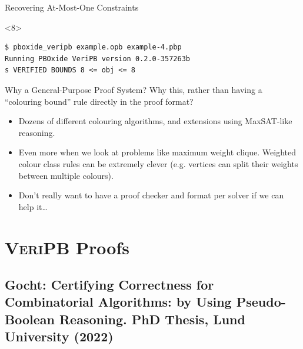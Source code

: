\documentclass[aspectratio=169,compress,10pt]{beamer}
\makeatletter
\newcommand{\proofsystemformat}[1]{\textsc{#1}\@}
\newcommand{\veripb}{\proofsystemformat{VeriPB}\xspace}
\makeatother
\begin{document}
\begin{frame}[fragile]{Recovering At-Most-One Constraints}
\begin{onlyenv}
%
\end{onlyenv}\begin{onlyenv}<8>
\begin{Verbatim}
$ pboxide_veripb example.opb example-4.pbp
Running PBOxide VeriPB version 0.2.0-357263b
s VERIFIED BOUNDS 8 <= obj <= 8
\end{Verbatim}
\end{onlyenv}
\end{frame}

\begin{frame}{Why a General-Purpose Proof System?}
    Why this, rather than having a ``colouring bound'' rule directly in the proof format?
    \begin{itemize}
        \item Dozens of different colouring algorithms, and extensions using MaxSAT-like reasoning.
        \item Even more when we look at problems like maximum weight clique.
            Weighted colour class rules can be extremely clever (e.g. vertices can split their weights
            between multiple colours).
        \item Don't really want to have a proof checker and format per solver if we can help it\ldots
    \end{itemize}
\end{frame}

\section{\veripb Proofs}

\subsection{Gocht: Certifying Correctness for Combinatorial Algorithms: by Using Pseudo-Boolean
Reasoning. PhD Thesis, Lund University (2022)}
\end{document}
